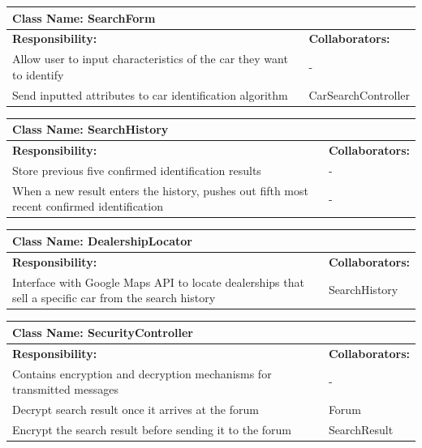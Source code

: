 \documentclass[12pt]{article}
\begin{document}
	\begin{table}[ht]
		\centering
		\begin{tabular}{|p{5cm}|p{5cm}|}
			\hline
			\multicolumn{2}{|l|}{\textbf{Class Name:} SearchForm} \\
			\hline
			\textbf{Responsibility:} & \textbf{Collaborators:} \\
			\hline
			Allow user to input characteristics of the car they want to identify & -\\
			\hline
			Send inputted attributes to car identification algorithm & CarSearchController\\
			\hline
		\end{tabular}
	\end{table}

	\begin{table}[ht]
		\centering
		\begin{tabular}{|p{5cm}|p{5cm}|}
			\hline
			\multicolumn{2}{|l|}{\textbf{Class Name:} SearchHistory} \\
			\hline
			\textbf{Responsibility:} & \textbf{Collaborators:} \\
			\hline
			Store previous five confirmed identification results & -\\
			\hline
			When a new result enters the history, pushes out fifth most recent confirmed identification & -\\
			\hline
		\end{tabular}
	\end{table}

	\begin{table}[ht]
		\centering
		\begin{tabular}{|p{5cm}|p{5cm}|}
			\hline
			\multicolumn{2}{|l|}{\textbf{Class Name:} DealershipLocator} \\
			\hline
			\textbf{Responsibility:} & \textbf{Collaborators:} \\
			\hline
			Interface with Google Maps API to locate dealerships that sell a specific car from the search history & SearchHistory\\
			\hline
		\end{tabular}
	\end{table}

	\begin{table}[ht]
		\centering
		\begin{tabular}{|p{5cm}|p{5cm}|}
			\hline
			\multicolumn{2}{|l|}{\textbf{Class Name:} SecurityController} \\
			\hline
			\textbf{Responsibility:} & \textbf{Collaborators:} \\
			\hline
			Contains encryption and decryption mechanisms for transmitted messages & -\\
			\hline
			Decrypt search result once it arrives at the forum & Forum\\
			\hline
			Encrypt the search result before sending it to the forum & SearchResult\\
			\hline
		\end{tabular}
	\end{table}
\end{document}
